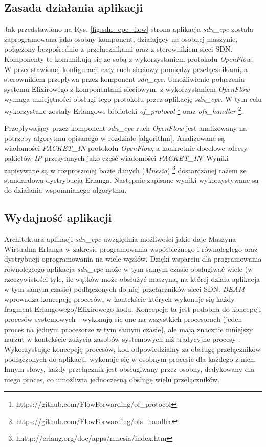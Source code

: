 \subsection{Zasada działania aplikacji}

Jak przedstawiono na Rys. \ref{fig:sdn_epc_flow} strona
\pageref{fig:sdn_epc_flow} aplikacja \textit{sdn\_epc} została zaprogramowana
jako osobny komponent, działający na osobnej maszynie, połączony bezpośrednio z
przełącznikami oraz z sterownikiem sieci SDN. Komponenty te komunikują się ze
sobą z wykorzystaniem protokołu \textit{OpenFlow}. W przedstawionej konfiguracji
cały ruch sieciowy pomiędzy przełącznikami, a sterownikiem przepływa przez
komponent \textit{sdn\_epc}. Umożliwienie połączenia systemu Elixirowego z
komponentami sieciowym, z wykorzystaniem \textit{OpenFlow} wymaga umiejętności
obsługi tego protokołu przez aplikację \textit{sdn\_epc}. W tym celu
wykorzystane zostały Erlangowe biblioteki \textit{of\_protocol}
\footnote{https://github.com/FlowForwarding/of\_protocol} oraz
\textit{ofs\_handler} \footnote{https://github.com/FlowForwarding/ofs\_handler}.

Przepływający przez komponent \textit{sdn\_epc} ruch \textit{OpenFlow} jest
analizowany na potrzeby algorytmu opisanego w rozdziale \ref{algorithm}.
Analizowane są wiadomości \textit{PACKET\_IN} protokołu \textit{OpenFlow}, a
konkretnie docelowe adresy pakietów \textit{IP} przesyłanych jako część
wiadomości \textit{PACKET\_IN}. Wyniki zapisywane są w rozproszonej bazie danych
(\textit{Mnesia}) \footnote{hhttp://erlang.org/doc/apps/mnesia/index.htm}
dostarczanej razem ze standardową dystrybucją Erlanga. Następnie zapisane
wyniki wykorzystywane są do działania wspomnianego algorytmu.

\subsection{Wydajność aplikacji}

Architektura aplikacji \textit{sdn\_epc} uwzględnia możliwości jakie daje
Maszyna Wirtualna Erlanga w zakresie programowania współbieżnego i równoległego
oraz dystrybucji oprogramowania na wiele węzłów. Dzięki wsparciu dla
programowania równoległego aplikacja \textit{sdn\_epc} może w tym samym czasie
obsługiwać wiele (w rzeczywistości tyle, ile wątków może obsłużyć maszyna, na
której działa aplikacja w tym samym czasie) podłączonych do niej przełączników
sieci SDN. \textit{BEAM} wprowadza koncepcję procesów, w kontekście których
wykonuje się każdy fragment Erlangowego/Elixirowego kodu. Koncepcja ta jest
podobna do koncepcji procesów systemowych - wykonują się one na wszystkich
procesorach (jeden proces na jednym procesorze w tym samym czasie), ale mają
znacznie mniejszy narzut w kontekście zużycia zasobów systemowych niż tradycyjne
procesy \cite{progelixir}. Wykorzystując koncepcję procesów, kod odpowiedzialny
za obsługę przełączników podłączonych do aplikacji, wykonuje się w osobnym
procesie dla każdego z nich. Innym słowy, każdy przełącznik jest obsługiwany
przez osobny, dedykowany dla niego proces, co umożliwia jednoczesną obsługę
wielu przełączników.

